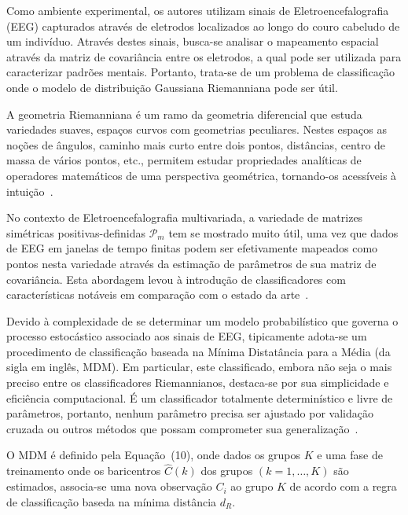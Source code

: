 \documentclass[a4paper,titlepage]{article}
\begin{document}
Como ambiente experimental, os autores utilizam sinais de Eletroencefalografia
(EEG) capturados através de eletrodos localizados ao longo do couro cabeludo de
um indivíduo. Através destes sinais, busca-se analisar o mapeamento espacial
através da matriz de covariância entre os eletrodos, a qual pode ser utilizada
para caracterizar padrões mentais. Portanto, trata-se de um problema de
classificação onde o modelo de distribuição Gaussiana Riemanniana pode ser
útil.

A geometria Riemanniana é um ramo da geometria diferencial que estuda
variedades suaves, espaços curvos com geometrias peculiares. Nestes espaços as
noções de ângulos, caminho mais curto entre dois pontos, distâncias, centro de
massa de vários pontos, etc., permitem estudar propriedades analíticas de
operadores matemáticos de uma perspectiva geométrica, tornando-os acessíveis à
intuição~\cite{levi1925lezioni,congedo2019riemannian}.

No contexto de Eletroencefalografia multivariada, a variedade de matrizes
simétricas positivas-definidas $\mathcal{P}_m$ tem se mostrado muito útil, uma
vez que dados de EEG em janelas de tempo finitas podem ser efetivamente
mapeados como pontos nesta variedade através da estimação de parâmetros de sua
matriz de covariância. Esta abordagem levou à introdução de classificadores com
características notáveis em comparação com o estado da
arte~\cite{congedo2019riemannian}.

Devido à complexidade de se determinar um modelo probabilístico que governa
o processo estocástico associado aos sinais de EEG, tipicamente adota-se um
procedimento de classificação baseada na Mínima Distatância para a Média (da
sigla em inglês, MDM). Em particular, este classificado, embora não seja o mais
preciso entre os classificadores Riemannianos, destaca-se por sua simplicidade
e eficiência computacional. É um classificador totalmente determinístico e
livre de parâmetros, portanto, nenhum parâmetro precisa ser ajustado por
validação cruzada ou outros métodos que possam comprometer sua
generalização~\cite{congedo2019riemannian}.

O MDM é definido pela Equação~(10), onde dados os grupos $K$ e uma fase de
treinamento onde os baricentros $\hat{C}(k)$ dos grupos $(k=1,\ldots,K)$ são
estimados, associa-se uma nova observação $C_i$ ao grupo $\hat{K}$ de acordo
com a regra de classificação baseda na mínima distância $d_R$.
\end{document}
